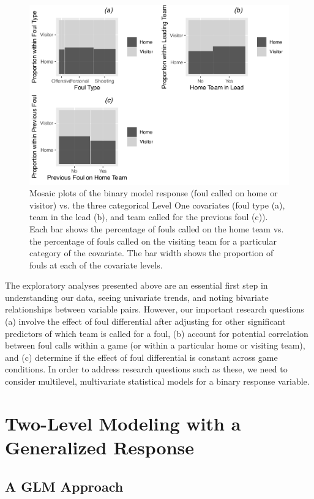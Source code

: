 \documentclass[
]{krantz}
\begin{document}
\begin{figure}

{\centering \includegraphics[width=0.6\linewidth]{bookdown-BeyondMLR_files/figure-latex/gmu-barmat1-1} 

}

\caption{Mosaic plots of the binary model response (foul called on home or visitor) vs. the three categorical Level One covariates (foul type (a), team in the lead (b), and team called for the previous foul (c)).  Each bar shows the percentage of fouls called on the home team vs. the percentage of fouls called on the visiting team for a particular category of the covariate.  The bar width shows the proportion of fouls at each of the covariate levels.}\label{fig:gmu-barmat1}
\end{figure}

The exploratory analyses presented above are an essential first step in understanding our data, seeing univariate trends, and noting bivariate relationships between variable pairs. However, our important research questions (a) involve the effect of foul differential after adjusting for other significant predictors of which team is called for a foul, (b) account for potential correlation between foul calls within a game (or within a particular home or visiting team), and (c) determine if the effect of foul differential is constant across game conditions. In order to address research questions such as these, we need to consider multilevel, multivariate statistical models for a binary response variable.

\section{Two-Level Modeling with a Generalized Response}\label{twolevelmodeling-glmm}

\subsection{A GLM Approach}\label{multregr-glmm}
\end{document}
